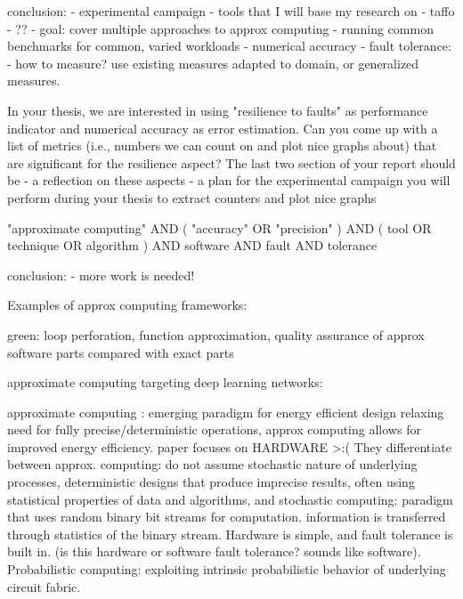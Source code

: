 conclusion:
- experimental campaign
    - tools that I will base my research on
        - taffo
        - ??
        - goal: cover multiple approaches to approx computing
        - running common benchmarks for common, varied workloads
            - numerical accuracy
            - fault tolerance:
                - how to measure? use existing measures adapted to domain, or generalized measures.
            

In your thesis, we are interested in using "resilience to faults" as performance indicator and numerical accuracy as error estimation.
Can you come up with a list of metrics (i.e., numbers we can count on and plot nice graphs about) that are significant for the resilience aspect?
The last two section of your report should be
- a reflection on these aspects
- a plan for the experimental campaign you will perform during your thesis to extract counters and plot nice graphs

"approximate computing" AND ( "accuracy" OR "precision" ) AND ( tool OR technique OR algorithm ) AND software AND fault AND tolerance

conclusion:
- more work is needed!


  

Examples of approx computing frameworks:

green: loop perforation, function approximation, quality assurance of approx software parts compared with exact parts

approximate computing targeting deep learning networks:





approximate computing : emerging paradigm for energy efficient design
relaxing need for fully precise/deterministic operations, approx computing allows for improved energy efficiency. paper focuses on HARDWARE >:( \cite{han2013approximate} They differentiate between approx. computing: do not assume stochastic nature of underlying processes, deterministic designs that produce imprecise results, often using statistical properties of data and algorithms, and stochastic computing: paradigm that uses random binary bit streams for computation. information is transferred through statistics of the binary stream. Hardware is simple, and fault tolerance is built in. (is this hardware or software fault tolerance? sounds like software). Probabilistic computing: exploiting intrinsic probabilistic behavior of underlying circuit fabric. \cite{han2013approximate}



